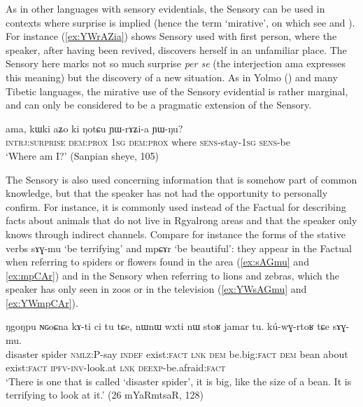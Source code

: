 \documentclass[oldfontcommands,oneside,a4paper,11pt]{article}
\newcommand{\ipa}[1]{{\phon \mbox{#1}}} %
\newcommand{\refb}[1]{(\ref{#1})}
\newcommand{\factual}[1]{\textsc{:fact}}
\begin{document}
 
As in other languages with sensory evidentials, the Sensory can be used in contexts where surprise is implied (hence the term `mirative', on which see \citealt{delancey97mirative} and \citealt{hill12mirativity}). For instance \refb{ex:YWrAZia} shows Sensory used with first person, where the speaker, after having been revived, discovers herself in an unfamiliar place. The Sensory here marks not so much surprise \textit{per se} (the interjection \ipa{ama} expresses this meaning) but the discovery of a new situation. As in Yolmo (\citealt[208]{gawne13copulas}) and many Tibetic languages, the mirative use of the Sensory evidential is rather marginal, and can only be considered to be a pragmatic extension of the Sensory.

\begin{exe}
\ex \label{ex:YWrAZia}
\gll 
\ipa{ama,}  	\ipa{kɯki}  	\ipa{aʑo}  	\ipa{ki}  	\ipa{ŋotɕu}  	\ipa{ɲɯ-rɤʑi-a}  	\ipa{ɲɯ-ŋu?}  \\
\textsc{intrj:surprise} \textsc{dem:prox} \textsc{1sg} \textsc{dem:prox} where \textsc{sens}-stay-\textsc{1sg} \textsc{sens}-be \\
\glt `Where am I?' (Sanpian sheye, 105)
\end{exe}


The Sensory is also used concerning information that is somehow part of common knowledge, but that the speaker has not had the opportunity to personally confirm. For instance, it is commonly used instead of the Factual for describing facts about animals that do not live in Rgyalrong areas and that the speaker only knows through indirect channels. Compare for instance the forms of the stative verbs \ipa{sɤɣ-mu} `be terrifying' and \ipa{mpɕɤr} `be beautiful': they appear in the Factual when referring to  spiders or flowers found in the area (\ref{ex:sAGmu} and \ref{ex:mpCAr}) and in the Sensory when referring to lions and zebras, which the speaker has only seen in zoos or in the television  (\ref{ex:YWsAGmu} and \ref{ex:YWmpCAr}).
 
 \begin{exe}
\ex \label{ex:sAGmu}
\gll 
\ipa{ŋgoŋpu}  	\ipa{ɴɢoɕna}  	\ipa{kɤ-ti}  	\ipa{ci}  	\ipa{tu}  	\ipa{tɕe,}  	\ipa{nɯnɯ}  	\ipa{wxti}  	\ipa{nɯ}  	\ipa{stoʁ}  	\ipa{jamar}  	\ipa{tu.}  	\ipa{kú-wɣ-rtoʁ}  	\ipa{tɕe}  	\ipa{sɤɣ-mu.}  \\
disaster spider \textsc{nmlz}:P-say \textsc{indef} exist\factual{} \textsc{lnk} \textsc{dem} be.big\factual{} \textsc{dem} bean about exist\factual{} \textsc{ipfv-inv}-look.at \textsc{lnk} \textsc{deexp}-be.afraid\factual{}  \\
\glt `There is one that is  called `disaster spider', it is big, like the size of a bean. It is terrifying to look at it.' (26 mYaRmtsaR, 128)
\end{exe}
\end{document}
